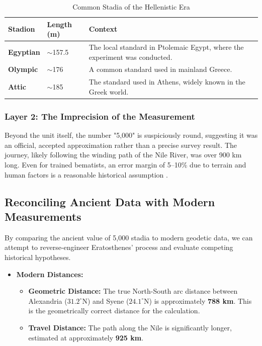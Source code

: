 \documentclass[11pt]{article}
\begin{document}
\begin{table}[htbp]
\centering
\caption{Common Stadia of the Hellenistic Era}
\label{tab:stadia}
\small
\begin{tabular}{@{}lll@{}}
\toprule
\textbf{Stadion} & \textbf{Length (m)} & \textbf{Context} \\
\midrule
\textbf{Egyptian} & $\sim$157.5 & The local standard in Ptolemaic Egypt, where the experiment was conducted. \\
\addlinespace
\textbf{Olympic} & $\sim$176 & A common standard used in mainland Greece. \\
\addlinespace
\textbf{Attic} & $\sim$185 & The standard used in Athens, widely known in the Greek world. \\
\bottomrule
\end{tabular}
\end{table}

\subsubsection{Layer 2: The Imprecision of the Measurement}
Beyond the unit itself, the number "5,000" is suspiciously round, suggesting it was an official, accepted approximation rather than a precise survey result. The journey, likely following the winding path of the Nile River, was over 900 km long. Even for trained bematists, an error margin of 5--10\% due to terrain and human factors is a reasonable historical assumption \cite{Engels1985}.

\subsection{Reconciling Ancient Data with Modern Measurements}

By comparing the ancient value of 5,000 stadia to modern geodetic data, we can attempt to reverse-engineer Eratosthenes' process and evaluate competing historical hypotheses.

\begin{itemize}
    \item \textbf{Modern Distances:}
    \begin{itemize}
        \item \textbf{Geometric Distance:} The true North-South arc distance between Alexandria ($31.2^{\circ}$N) and Syene ($24.1^{\circ}$N) is approximately \textbf{788 km}. This is the geometrically correct distance for the calculation.
        \item \textbf{Travel Distance:} The path along the Nile is significantly longer, estimated at approximately \textbf{925 km}.
    \end{itemize}
\end{itemize}
\end{document}
